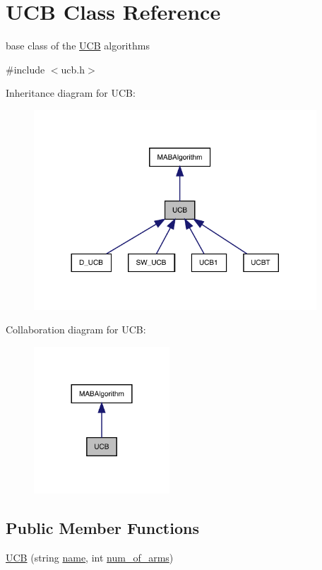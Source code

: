 \hypertarget{class_u_c_b}{}\section{U\+CB Class Reference}
\label{class_u_c_b}


base class of the \mbox{\hyperlink{class_u_c_b}{U\+CB}} algorithms  




{\ttfamily \#include $<$ucb.\+h$>$}



Inheritance diagram for U\+CB\+:
\nopagebreak
\begin{figure}[H]
\begin{center}
\leavevmode
\includegraphics[width=300pt]{class_u_c_b__inherit__graph}
\end{center}
\end{figure}


Collaboration diagram for U\+CB\+:
\nopagebreak
\begin{figure}[H]
\begin{center}
\leavevmode
\includegraphics[width=144pt]{class_u_c_b__coll__graph}
\end{center}
\end{figure}
\subsection*{Public Member Functions}
\begin{DoxyCompactItemize}
\item 
\mbox{\hyperlink{class_u_c_b_aa3ac4e46bb3b27fa50a02ea4aaada240}{U\+CB}} (string \mbox{\hyperlink{class_m_a_b_algorithm_a77b10ecc4b49d519c557f65358167b82}{name}}, int \mbox{\hyperlink{class_m_a_b_algorithm_a340fa9e83e85b092f2c6125fc4e8549b}{num\+\_\+of\+\_\+arms}})
\end{DoxyCompactItemize}
